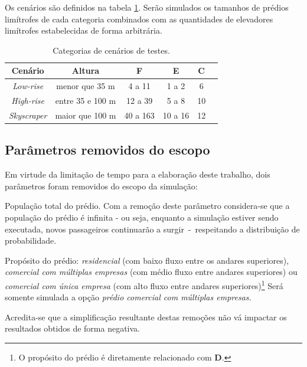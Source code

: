 Os cenários são definidos na tabela \ref{tab:cenarios}. Serão simulados os
tamanhos de prédios limítrofes de cada categoria combinados com as quantidades
de elevadores limítrofes estabelecidas de forma arbitrária.

\begin{table}[htb!]
\centering
\caption{Categorias de cenários de testes.}
\label{tab:cenarios}
\begin{tabular}{|c|c|c|c|c|c|}
\hline
{\bf Cenário} & {\bf Altura} & {\bf F}  & {\bf E} & {\bf C}
\\ \hline
{\it Low-rise}   & menor que 35 m    & 4 a 11         & 1 a 2   & 6  \\ \hline
{\it High-rise}  & entre 35 e 100 m  & 12 a 39        & 5 a 8   & 10 \\ \hline
{\it Skyscraper} & maior que 100 m   & 40 a 163       & 10 a 16 & 12 \\ \hline
\end{tabular}
\end{table}

\subsection{Parâmetros removidos do escopo}

Em virtude da limitação de tempo para a elaboração deste trabalho, dois
parâmetros foram removidos do escopo da simulação:

\begin{description}[leftmargin=!,labelwidth=\widthof{\bfseries Pu}]
  \item[P]
  População total do prédio. Com a remoção deste parâmetro considera-se que a
  população do prédio é infinita - ou seja, enquanto a simulação estiver sendo
  executada, novos passageiros continuarão a surgir~-~respeitando a distribuição
  de probabilidade.

  \item[Pu]
  Propósito do prédio: \textit{residencial} (com baixo fluxo entre os andares
  superiores), \textit{comercial com múltiplas empresas} (com médio fluxo entre
  andares superiores) ou \textit{comercial com única empresa} (com alto fluxo
  entre andares superiores)\footnote{O propósito do prédio é diretamente
  relacionado com \textbf{D}.} Será somente simulada a opção \textit{prédio
  comercial com múltiplas empresas.}
\end{description}

Acredita-se que a simplificação resultante destas remoções não vá impactar os
resultados obtidos de forma negativa.
